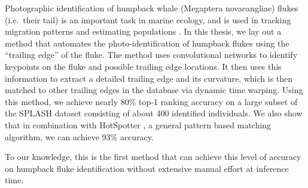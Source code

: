  

Photographic identification of humpback whale (Megaptera novaeangliae) flukes (i.e.\ their tail) is an important task in marine ecology, and is used in tracking migration patterns and estimating populations \cite{blackmer2000temporal, calambokidis2008splash}.
In this thesis, we lay out a method that automates the photo-identification of humpback flukes using the ``trailing edge'' of the fluke.
The method uses convolutional networks to identify keypoints on the fluke and possible trailing edge locations.
It then uses this information to extract a detailed trailing edge and its curvature, which is then matched to other trailing edges in the database via dynamic time warping.
Using this method, we achieve nearly 80\% top-1 ranking accuracy on a large subset of the SPLASH \cite{calambokidis2008splash} dataset consisting of about 400 identified individuals.
We also show that in combination with HotSpotter \cite{crall_hotspotter_2013}, a general pattern based matching algorithm, we can achieve 93\% accuracy.

To our knowledge, this is the first method that can achieve this level of accuracy on humpback fluke identification without extensive manual effort at inference time.





